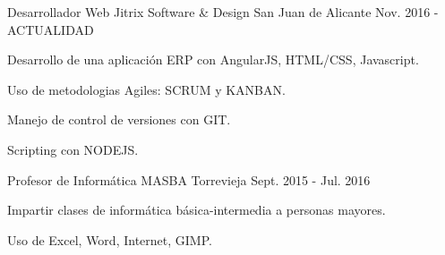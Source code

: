 

\begin{cventries}




  \cventry
    {Desarrollador Web} %
    {Jitrix Software \& Design} %
    {San Juan de Alicante} %
    {Nov. 2016 - ACTUALIDAD} %
    {
      \begin{cvitems} %
        \item {Desarrollo de una aplicación ERP con AngularJS, HTML/CSS, Javascript.}
        \item {Uso de metodologias Agiles: SCRUM y KANBAN.}
        \item {Manejo de control de versiones con GIT.}
        \item {Scripting con NODEJS.}
      \end{cvitems}
    }


  \cventry
    {Profesor de Informática} %
    {MASBA} %
    {Torrevieja} %
    {Sept. 2015 - Jul. 2016} %
    {
      \begin{cvitems} %
        \item {Impartir clases de informática básica-intermedia a personas mayores.}
        \item {Uso de Excel, Word, Internet, GIMP.}
      \end{cvitems}
    }


\end{cventries}
